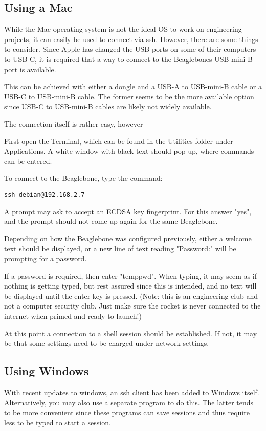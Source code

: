 \documentclass[12pt,article]{memoir}
\begin{document}
\subsection{Using a Mac}
While the Mac operating system is not the ideal OS  to work on engineering projects, it can easily be used to connect via ssh. However, there are some things to consider. Since Apple has changed the USB ports on some of their computers to USB-C, it is required that a way to connect to the Beaglebones USB mini-B port is available.\par
This can be achieved with either a dongle and a USB-A to USB-mini-B cable or a USB-C to USB-mini-B cable. The former seems to be the more available option since USB-C to USB-mini-B cables are likely not widely available.\par
The connection itself is rather easy, however\par
First open the Terminal, which can be found in the Utilities folder under Applications. A white window with black text should pop up, where commands can be entered.\par
To connect to the Beaglebone, type the command:\par
\begin{lstlisting}
ssh debian@192.168.2.7
\end{lstlisting}

A prompt may ask to accept an ECDSA key fingerprint. For this answer "yes", and the prompt should not come up again for the same Beaglebone.\par
Depending on how the Beaglebone was configured previously, either a welcome text should be displayed, or a new line of text reading "Password:" will be prompting for a password.\par
If a password is required, then enter "temppwd". When typing, it may seem as if nothing is getting typed, but rest assured since this is intended, and no text will be displayed until the enter key is pressed. (Note: this is an engineering club and not a computer security club. Just make sure the rocket is never connected to the internet when primed and ready to launch!)\par
At this point a connection to a shell session should be established. If not, it may be that some settings need to be charged under network settings.\par

\newpage

\subsection{Using Windows}
With recent updates to windows, an ssh client has been added to Windows itself. Alternatively, you may also use a separate program to do this. The latter tends to be more convenient since these programs can save sessions and thus require less to be typed to start a session.
\end{document}
